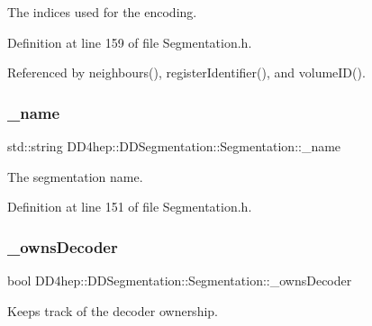 The indices used for the encoding. 



Definition at line 159 of file Segmentation.\+h.



Referenced by neighbours(), register\+Identifier(), and volume\+I\+D().

\hypertarget{class_d_d4hep_1_1_d_d_segmentation_1_1_segmentation_aa129e659e465d9a0a60c7160d29de483}{}\label{class_d_d4hep_1_1_d_d_segmentation_1_1_segmentation_aa129e659e465d9a0a60c7160d29de483} 
\subsubsection{\texorpdfstring{\+\_\+name}{\_name}}
{\footnotesize\ttfamily std\+::string D\+D4hep\+::\+D\+D\+Segmentation\+::\+Segmentation\+::\+\_\+name\hspace{0.3cm}{\ttfamily [protected]}}



The segmentation name. 



Definition at line 151 of file Segmentation.\+h.

\hypertarget{class_d_d4hep_1_1_d_d_segmentation_1_1_segmentation_a0e9e3e6639a67335971b827cf045cd4f}{}\label{class_d_d4hep_1_1_d_d_segmentation_1_1_segmentation_a0e9e3e6639a67335971b827cf045cd4f} 
\subsubsection{\texorpdfstring{\+\_\+owns\+Decoder}{\_ownsDecoder}}
{\footnotesize\ttfamily bool D\+D4hep\+::\+D\+D\+Segmentation\+::\+Segmentation\+::\+\_\+owns\+Decoder\hspace{0.3cm}{\ttfamily [protected]}}



Keeps track of the decoder ownership. 



